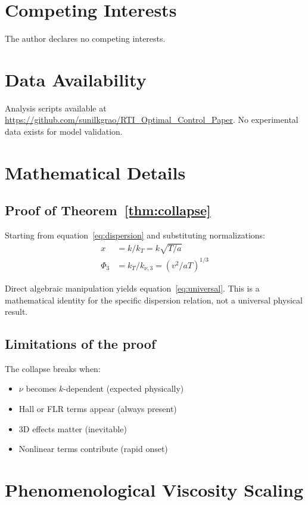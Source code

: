 \documentclass[aps,pre,twocolumn,showpacs,superscriptaddress]{revtex4-2}
\theoremstyle{definition}
\begin{document}
\section*{Competing Interests}
The author declares no competing interests.

\section*{Data Availability}
Analysis scripts available at \url{https://github.com/sunilkgrao/RTI_Optimal_Control_Paper}. No experimental data exists for model validation.

\appendix

\section{Mathematical Details}

\subsection{Proof of Theorem~\ref{thm:collapse}}

Starting from equation~\eqref{eq:dispersion} and substituting normalizations:
\begin{align}
x &= k/k_T = k\sqrt{T/a} \\
\Phi_3 &= k_T/k_{\nu,3} = (v^2/aT)^{1/3}
\end{align}

Direct algebraic manipulation yields equation~\eqref{eq:universal}. This is a mathematical identity for the specific dispersion relation, not a universal physical result.

\subsection{Limitations of the proof}

The collapse breaks when:
\begin{itemize}
\item $\nu$ becomes $k$-dependent (expected physically)
\item Hall or FLR terms appear (always present)
\item 3D effects matter (inevitable)
\item Nonlinear terms contribute (rapid onset)
\end{itemize}

\section{Phenomenological Viscosity Scaling}
\end{document}
